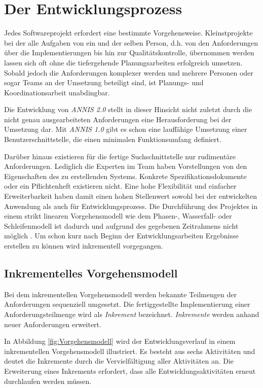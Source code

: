 \newpage
\section{Der Entwicklungsprozess}

Jedes Softwareprojekt erfordert eine bestimmte Vorgehensweise. Kleinstprojekte bei der alle Aufgaben von ein und der selben Person, d.h. von den Anforderungen über die Implementierungen bis hin zur Qualitätskontrolle, übernommen werden lassen sich oft ohne die tiefergehende Planungsarbeiten erfolgreich umsetzen. Sobald jedoch die Anforderungen komplexer werden und mehrere Personen oder sogar Teams an der Umsetzung beteiligt sind, ist Planungs- und Koordinationsarbeit unabdingbar.

Die Entwicklung von \emph{ANNIS 2.0} stellt in dieser Hinsicht nicht zuletzt durch die nicht genau ausgearbeiteten Anforderungen eine Herausforderung bei der Umsetzung dar. Mit \emph{ANNIS 1.0} gibt es schon eine lauffähige Umsetzung einer Benutzerschnittstelle, die einen minimalen Funktionsumfang definiert.

Darüber hinaus existieren für die fertige Suchschnittstelle nur rudimentäre Anforderungen. Lediglich die Experten im Team haben Vorstellungen von den Eigenschaften des zu erstellenden Systems. Konkrete Spezifikationsdokumente oder ein Pflichtenheft existieren nicht. Eine hohe Flexibilität und einfacher Erweiterbarkeit haben damit einen hohen Stellenwert sowohl bei der entwickelten Anwendung als auch für Entwicklungsprozess. Die Durchführung des Projektes in einem strikt linearen Vorgehensmodell wie dem Phasen-, Wasserfall- oder Schleifenmodell ist dadurch und aufgrund des gegebenen Zeitrahmens nicht möglich \citep[vgl.][Seiten 99-102]{bunse2002}. Um schon kurz nach Beginn der Entwicklungsarbeiten Ergebnisse erstellen zu können wird inkrementell vorgegangen.

\subsection{Inkrementelles Vorgehensmodell}\label{sec:Vorgehensmodell}

Bei dem inkrementellen Vorgehensmodell werden bekannte Teilmengen der Anforderungen sequenziell umgesetzt. Die fertiggestellte Implementierung einer Anforderungsteilmenge wird als \emph{Inkrement} bezeichnet. \emph{Inkremente} werden anhand neuer Anforderungen erweitert.

In Abbildung \ref{fig:Vorgehensmodell} wird der Entwicklungsverlauf in einem inkrementellen Vorgehensmodell illustriert. Es besteht aus sechs Aktivitäten und deutet die Inkremente durch die Vervielfältigung aller Aktivitäten an. Die Erweiterung eines Inkrements erfordert, dass alle Entwicklungsaktivitäten erneut durchlaufen werden müssen. 

